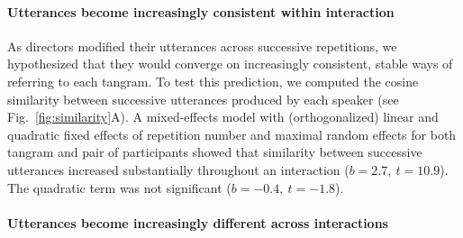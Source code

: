 \documentclass[alpha-refs]{wiley-article}
\begin{document}
\paragraph{Utterances become increasingly consistent within interaction} 
As directors modified their utterances across successive repetitions, we hypothesized that they would converge on increasingly consistent, stable ways of referring to each tangram.
To test this prediction, we computed the cosine similarity between successive utterances produced by each speaker (see Fig.~\ref{fig:similarity}A). %
A mixed-effects model with (orthogonalized) linear and quadratic fixed effects of repetition number and maximal random effects for both tangram and pair of participants showed that similarity between successive utterances increased substantially throughout an interaction ($b = 2.7,~t = 10.9$). 
The quadratic term was not significant ($b= -0.4,~t=-1.8$).


\paragraph{Utterances become increasingly different across interactions}
\end{document}
